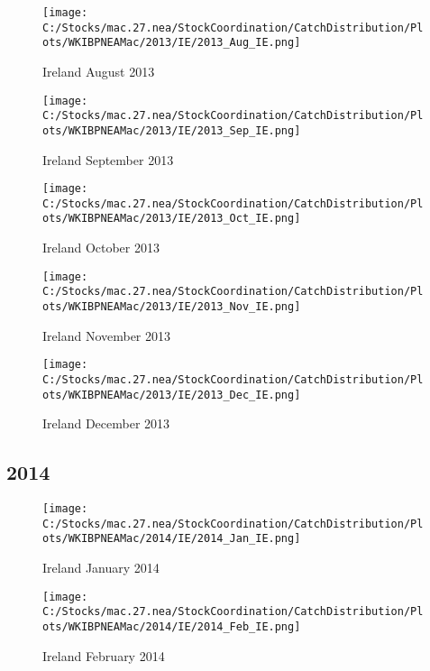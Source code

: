 \documentclass{article}
\begin{document}
\begin{figure}
	\centering
		\texttt{[image: C:/Stocks/mac.27.nea/StockCoordination/CatchDistribution/Plots/WKIBPNEAMac/2013/IE/2013\_Aug\_IE.png]}
	\caption{Ireland August 2013}
	\label{fig:2013_Aug_IE}
\end{figure}

\begin{figure}
	\centering
		\texttt{[image: C:/Stocks/mac.27.nea/StockCoordination/CatchDistribution/Plots/WKIBPNEAMac/2013/IE/2013\_Sep\_IE.png]}
	\caption{Ireland September 2013}
	\label{fig:2013_Sep_IE}
\end{figure}

\begin{figure}
	\centering
		\texttt{[image: C:/Stocks/mac.27.nea/StockCoordination/CatchDistribution/Plots/WKIBPNEAMac/2013/IE/2013\_Oct\_IE.png]}
	\caption{Ireland October 2013}
	\label{fig:2013_Oct_IE}
\end{figure}

\begin{figure}
	\centering
		\texttt{[image: C:/Stocks/mac.27.nea/StockCoordination/CatchDistribution/Plots/WKIBPNEAMac/2013/IE/2013\_Nov\_IE.png]}
	\caption{Ireland November 2013}
	\label{fig:2013_Nov_IE}
\end{figure}

\begin{figure}
	\centering
		\texttt{[image: C:/Stocks/mac.27.nea/StockCoordination/CatchDistribution/Plots/WKIBPNEAMac/2013/IE/2013\_Dec\_IE.png]}
	\caption{Ireland December 2013}
	\label{fig:2013_Dec_IE}
\end{figure}

\clearpage

\newpage

\subsection{2014}



\begin{figure}[h]
	\centering
		\texttt{[image: C:/Stocks/mac.27.nea/StockCoordination/CatchDistribution/Plots/WKIBPNEAMac/2014/IE/2014\_Jan\_IE.png]}
	\caption{Ireland January 2014}
	\label{fig:2014_Jan_IE}
\end{figure}

\begin{figure}
	\centering
		\texttt{[image: C:/Stocks/mac.27.nea/StockCoordination/CatchDistribution/Plots/WKIBPNEAMac/2014/IE/2014\_Feb\_IE.png]}
	\caption{Ireland February 2014}
	\label{fig:2014_Feb_IE}
\end{figure}
\end{document}
